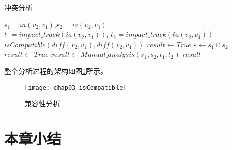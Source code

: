 \begin{algorithm}
	\caption{冲突分析}
	\label{algo_compatible}
	\begin{algorithmic}[1]
		\REQUIRE $s_1=ia(v_2,v_1)$,$s_2=ia(v_2,v_4)$\\
				 \quad \quad $t_1=impact\_track(ia(v_2,v_1))$, $t_2=impact\_track(ia(v_2,v_4))$
		\ENSURE $isCompatible(diff(v_2,v_1), diff(v_2,v_4))$
			\STATE $result \gets True$
		\ELSE
			\STATE $s \gets s_1 \cap s_2$
				\STATE $result \gets True$
			\ELSE				
				\STATE $result \gets Manual\_analysis(s_1, s_2, t_1, t_2)$
			\ENDIF 
		\ENDIF
		\RETURN $result$
	\end{algorithmic}
\end{algorithm}

整个分析过程的架构如图\ref {isCompatible}所示。

\begin{figure}[H]
	\centering
	\texttt{[image: chap03\_isCompatible]}
	\caption {兼容性分析}
	\label {isCompatible}	
\end{figure}


\section{本章小结}